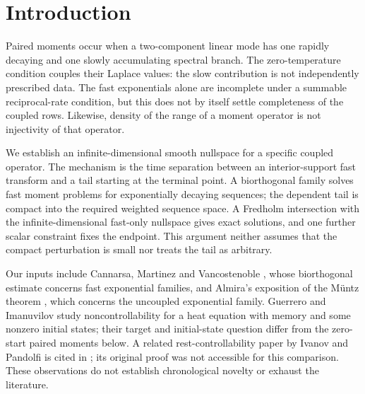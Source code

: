 \section{Introduction}\label{sec:introduction}
Paired moments occur when a two-component linear mode has one rapidly decaying and one slowly accumulating spectral branch. The zero-temperature condition couples their Laplace values: the slow contribution is not independently prescribed data. The fast exponentials alone are incomplete under a summable reciprocal-rate condition, but this does not by itself settle completeness of the coupled rows. Likewise, density of the range of a moment operator is not injectivity of that operator.

We establish an infinite-dimensional smooth nullspace for a specific coupled operator. The mechanism is the time separation between an interior-support fast transform and a tail starting at the terminal point. A biorthogonal family solves fast moment problems for exponentially decaying sequences; the dependent tail is compact into the required weighted sequence space. A Fredholm intersection with the infinite-dimensional fast-only nullspace gives exact solutions, and one further scalar constraint fixes the endpoint. This argument neither assumes that the compact perturbation is small nor treats the tail as arbitrary.

Our inputs include Cannarsa, Martinez and Vancostenoble \cite{Cannarsa2020}, whose biorthogonal estimate concerns fast exponential families, and Almira's exposition of the Müntz theorem \cite{Almira2007}, which concerns the uncoupled exponential family. Guerrero and Imanuvilov \cite{Guerrero2013} study noncontrollability for a heat equation with memory and some nonzero initial states; their target and initial-state question differ from the zero-start paired moments below. A related rest-controllability paper by Ivanov and Pandolfi is cited in \cite{Guerrero2013}; its original proof was not accessible for this comparison. These observations do not establish chronological novelty or exhaust the literature.
